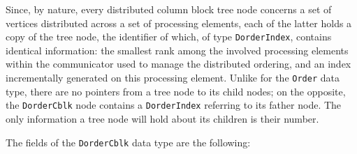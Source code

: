 Since, by nature, every distributed column block tree node concerns a
set of vertices distributed across a set of processing elements, each
of the latter holds a copy of the tree node, the identifier of which,
of type \texttt{Dorder\lbt Index}, contains identical information: the
smallest rank among the involved processing elements within the
communicator used to manage the distributed ordering, and an index
incrementally generated on this processing element. Unlike for the
\texttt{Order} data type, there are no pointers from a tree node to
its child nodes; on the opposite, the \texttt{Dorder\lbt Cblk} node
contains a \texttt{Dorder\lbt Index} referring to its father node. The
only information a tree node will hold about its children is their
number.

The fields of the \texttt{DorderCblk} data type are the following:
